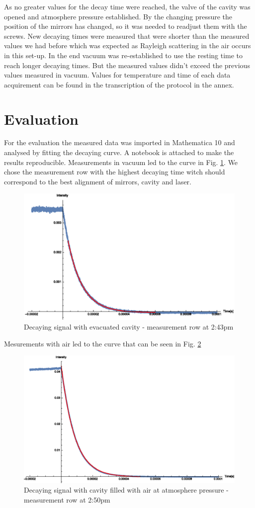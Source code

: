 \documentclass[
	parskip=half,10pt,
	numbers= noenddot, %
	toc=flat, %
	oneside,
	twocolumn,
	]{scrartcl}
\begin{document}
As no greater values for the decay time were reached, the valve of the cavity was opened and atmosphere pressure established. By the changing pressure the position of the mirrors has changed, so it was needed to readjust them with the screws.
New decaying times were measured that were shorter than the measured values we had before which was expected as Rayleigh scattering in the air occurs in this set-up.
In the end vacuum was re-established to use the resting time to reach longer decaying times. But the measured values didn't exceed the previous values measured in vacuum. 
Values for temperature and time of each data acquirement can be found in the transcription of the protocol in the annex.
\section{Evaluation}
For the evaluation the measured data was imported in Mathematica 10 and analysed by fitting the decaying curve. A notebook is attached to make the results reproducible.
Measurements in vacuum led to the curve in Fig. \ref{fig:vacuum}. We chose the measurement row with the highest decaying time witch should correspond to the best alignment of mirrors, cavity and laser. 
\begin{figure}
\includegraphics[width=\textwidth/2]{images/vacuum.eps}
\caption{Decaying signal with evacuated cavity - measurement row at 2:43pm}
\label{fig:vacuum}
\end{figure}
Mesurements with air led to the curve that can be seen in Fig. \ref{fig:air}
\begin{figure}
\includegraphics[width=\textwidth/2]{images/air.eps}
\caption{Decaying signal with cavity filled with air at atmosphere pressure - measurement row at 2:50pm}
\label{fig:air}
\end{figure}
\end{document}
